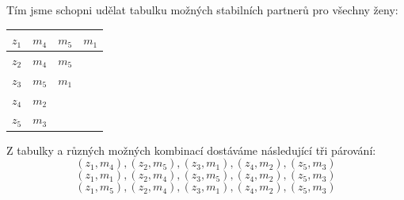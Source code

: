 \documentclass[a4paper, 11pt]{article}
\begin{document}
  Tím jsme schopni udělat tabulku možných stabilních partnerů pro všechny ženy:
  
  \begin{table}[h]
    \begin{tabular}{|l||l|l|l|}
    \hline
      $z_1$& $m_4$ & $m_5$  & $m_1$\\ \hline
      $z_2$& $m_4$ & $m_5$ &\\ \hline
      $z_3$& $m_5$ & $m_1$ &\\ \hline
      $z_4$& $m_2$ &  &\\ \hline
      $z_5$& $m_3$ &  & \\ \hline
    \end{tabular}
  \end{table}

  Z tabulky a různých možných kombinací dostáváme následující tři párování:
  $$(z_1,m_4),(z_2,m_5),(z_3,m_1),(z_4,m_2),(z_5,m_3)$$
  $$(z_1,m_1),(z_2,m_4),(z_3,m_5),(z_4,m_2),(z_5,m_3)$$
  $$(z_1,m_5),(z_2,m_4),(z_3,m_1),(z_4,m_2),(z_5,m_3)$$
\end{document}

